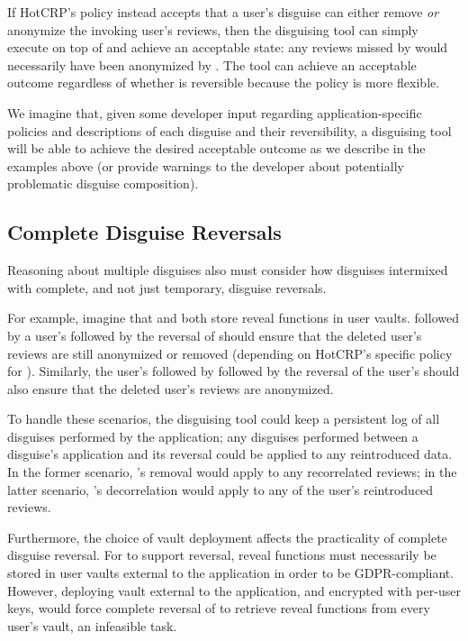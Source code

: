 If HotCRP's policy instead accepts that a user's \gdpr disguise can either remove \emph{or}
anonymize the invoking user's reviews, then the disguising tool can simply execute \gdpr on top of
\ca and achieve an acceptable state: any reviews missed by \gdpr would necessarily have been
anonymized by \ca.  The tool can achieve an acceptable outcome regardless of whether \ca is
reversible because the policy is more flexible.

We imagine that, given some developer input regarding application-specific policies and descriptions
of each disguise and their reversibility, a disguising tool will be able to achieve the desired acceptable
outcome as we describe in the examples above (or provide warnings to the developer about potentially
problematic disguise composition).

\subsection{Complete Disguise Reversals}
Reasoning about multiple disguises also must consider how disguises intermixed with
complete, and not just temporary, disguise reversals.

For example, imagine that \ca and \gdpr both store reveal functions in user vaults. 
%
\ca followed by a user's \gdpr followed by the reversal of \ca should ensure that the deleted user's
reviews are still anonymized or removed (depending on HotCRP's specific policy for \gdpr).
Similarly, the user's \gdpr followed by \ca followed by the reversal of the user's \gdpr should also
ensure that the deleted user's reviews are anonymized.

To handle these scenarios, the disguising tool could keep a persistent log of all disguises
performed by the application; any disguises performed between a disguise's application and its
reversal could be applied to any reintroduced data. In the former scenario, \gdpr's removal would
apply to any recorrelated reviews; in the latter scenario, \ca's decorrelation would apply to any of
the user's reintroduced reviews.

Furthermore, the choice of vault deployment affects the practicality of complete disguise reversal.
For \gdpr to support reversal, reveal functions must necessarily be stored in user vaults external
to the application in order to be GDPR-compliant.
However, deploying vault external to the application, and encrypted with per-user keys, would force complete reversal of \ca to retrieve reveal functions from every user's vault, an infeasible task.
